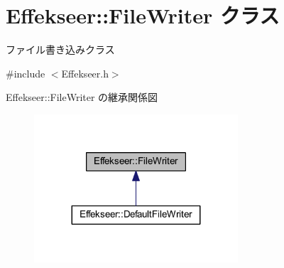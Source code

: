 \hypertarget{class_effekseer_1_1_file_writer}{}\section{Effekseer\+:\+:File\+Writer クラス}
\label{class_effekseer_1_1_file_writer}


ファイル書き込みクラス  




{\ttfamily \#include $<$Effekseer.\+h$>$}



Effekseer\+:\+:File\+Writer の継承関係図\nopagebreak
\begin{figure}[H]
\begin{center}
\leavevmode
\includegraphics[width=215pt]{class_effekseer_1_1_file_writer__inherit__graph}
\end{center}
\end{figure}
